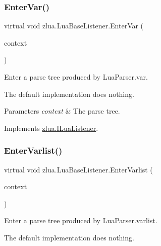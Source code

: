 \subsubsection{\texorpdfstring{Enter\+Var()}{EnterVar()}}
{\footnotesize\ttfamily virtual void zlua.\+Lua\+Base\+Listener.\+Enter\+Var (\begin{DoxyParamCaption}\item[{\mbox{[}\+Not\+Null\mbox{]} \mbox{\hyperlink{classzlua_1_1_lua_parser_1_1_var_context}{Lua\+Parser.\+Var\+Context}}}]{context }\end{DoxyParamCaption})\hspace{0.3cm}{\ttfamily [virtual]}}



Enter a parse tree produced by Lua\+Parser.\+var. 

The default implementation does nothing.


\begin{DoxyParams}{Parameters}
{\em context} & The parse tree.\\
\hline
\end{DoxyParams}


Implements \mbox{\hyperlink{interfacezlua_1_1_i_lua_listener_a1feba01e341c07825901bf0a1cd723e3}{zlua.\+I\+Lua\+Listener}}.

\mbox{\label{classzlua_1_1_lua_base_listener_a1b27cf500dda1c0eab2cbb8c747dddba}} 
\subsubsection{\texorpdfstring{Enter\+Varlist()}{EnterVarlist()}}
{\footnotesize\ttfamily virtual void zlua.\+Lua\+Base\+Listener.\+Enter\+Varlist (\begin{DoxyParamCaption}\item[{\mbox{[}\+Not\+Null\mbox{]} \mbox{\hyperlink{classzlua_1_1_lua_parser_1_1_varlist_context}{Lua\+Parser.\+Varlist\+Context}}}]{context }\end{DoxyParamCaption})\hspace{0.3cm}{\ttfamily [virtual]}}



Enter a parse tree produced by Lua\+Parser.\+varlist. 

The default implementation does nothing.



